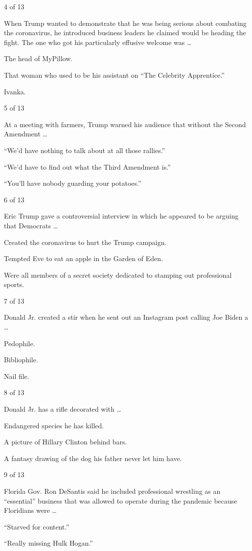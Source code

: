 4 of 13

When Trump wanted to demonstrate that he was being serious about
combating the coronavirus, he introduced business leaders he claimed
would be heading the fight. The one who got his particularly effusive
welcome was \ldots{}

The head of MyPillow.

That woman who used to be his assistant on ``The Celebrity Apprentice.''

Ivanka.

5 of 13

At a meeting with farmers, Trump warned his audience that without the
Second Amendment \ldots{}

``We'd have nothing to talk about at all those rallies.''

``We'd have to find out what the Third Amendment is.''

``You'll have nobody guarding your potatoes.''

6 of 13

Eric Trump gave a controversial interview in which he appeared to be
arguing that Democrats \ldots{}

Created the coronavirus to hurt the Trump campaign.

Tempted Eve to eat an apple in the Garden of Eden.

Were all members of a secret society dedicated to stamping out
professional sports.

7 of 13

Donald Jr. created a stir when he sent out an Instagram post calling Joe
Biden a \ldots{}

Pedophile.

Bibliophile.

Nail file.

8 of 13

Donald Jr. has a rifle decorated with \ldots{}

Endangered species he has killed.

A picture of Hillary Clinton behind bars.

A fantasy drawing of the dog his father never let him have.

9 of 13

Florida Gov. Ron DeSantis said he included professional wrestling as an
``essential'' business that was allowed to operate during the pandemic
because Floridians were \ldots{}

``Starved for content.''

``Really missing Hulk Hogan.''

